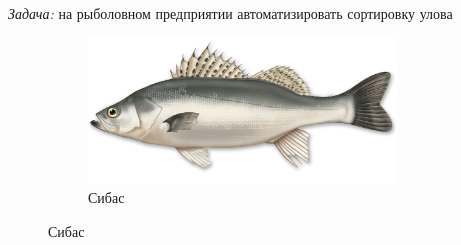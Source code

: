 \documentclass[10pt]{beamer}
\begin{document}
\begin{frame}{}

\begin{columns}[C]
    \begin{column}{.5\textwidth}
    {\it Задача:} на рыболовном предприятии автоматизировать сортировку улова
    \begin{figure}
        \centering
        \begin{subfigure}[b]{\textwidth}
                \includegraphics[width=0.9\textwidth]{images/seabass.jpg}
                \caption{Сибас}                
        \end{subfigure}
            

\end{figure}
\end{column}
\end{columns}
\end{frame}
\end{document}
